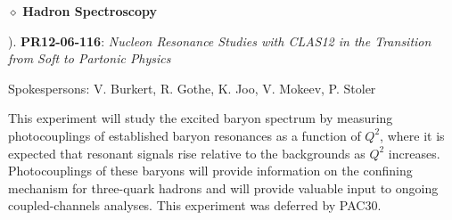 \vskip 0.5cm

\noindent
\begin{large}
$\diamond$ {\bf Hadron Spectroscopy}
\end{large}

\vskip 0.3cm

\begin{small}
). {\bf PR12-06-116}: {\it Nucleon Resonance Studies with CLAS12 in
the Transition from Soft to Partonic Physics}

\vskip 0.2cm

\begin{footnotesize}
Spokespersons: V. Burkert, R. Gothe, K. Joo, V. Mokeev, P. Stoler
\end{footnotesize}

\vskip 0.2cm

This experiment will study the excited baryon spectrum by measuring 
photocouplings of established baryon resonances as a function of $Q^2$, 
where it is expected that resonant signals rise relative to the 
backgrounds as $Q^2$ increases.  Photocouplings of these baryons will
provide information on the confining mechanism for three-quark hadrons
and will provide valuable input to ongoing coupled-channels analyses.  This 
experiment was deferred by PAC30.
\end{small}

